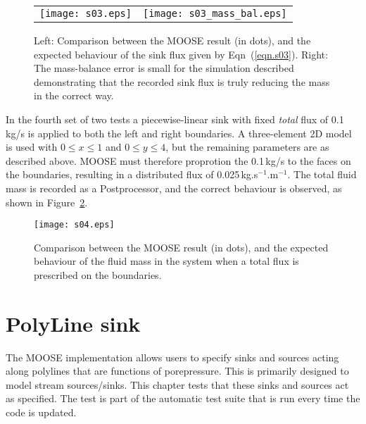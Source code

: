 \documentclass[]{scrreprt}
\begin{document}
\begin{figure}[htb]
\centering
\begin{tabular}{cc}
\texttt{[image: s03.eps]} &
\texttt{[image: s03\_mass\_bal.eps]}
\end{tabular}
\caption{Left: Comparison between the MOOSE result (in dots), and the
  expected behaviour of the sink flux given by Eqn~(\ref{eqn.s03}).
  Right: The mass-balance error is small for the simulation described
  demonstrating that the recorded sink flux is truly reducing the mass
  in the correct way.}
\label{s03.fig}
\end{figure}


\noindent In the fourth set of two tests a piecewise-linear sink with
fixed {\em total} flux of 0.1\,kg/s is applied to both the left and
right boundaries.  A three-element 2D model is used with $0\leq x \leq
1$ and $0\leq y \leq 4$, but the remaining parameters are as described
above.  MOOSE must therefore proprotion the 0.1\,kg/s to the faces on
the boundaries, resulting in a distributed flux of
0.025\,kg.s$^{-1}$.m$^{-1}$.  The total fluid mass is recorded as a
Postprocessor, and the correct behaviour is observed, as shown in
Figure~\ref{s04.fig}.

\begin{figure}[htb]
\centering
\texttt{[image: s04.eps]}
\caption{Comparison between the MOOSE result (in dots), and the
  expected behaviour of the fluid mass in the system when a total flux
  is prescribed on the boundaries.}
\label{s04.fig}
\end{figure}

\chapter{PolyLine sink}
\label{st}

The MOOSE implementation allows users to specify sinks and sources
acting along polylines that are functions of porepressure.  This is
primarily designed to model stream sources/sinks.  This chapter
tests that these sinks and sources act as specified.  The test is
part of the automatic test suite that is run every time the code is
updated.
\end{document}

